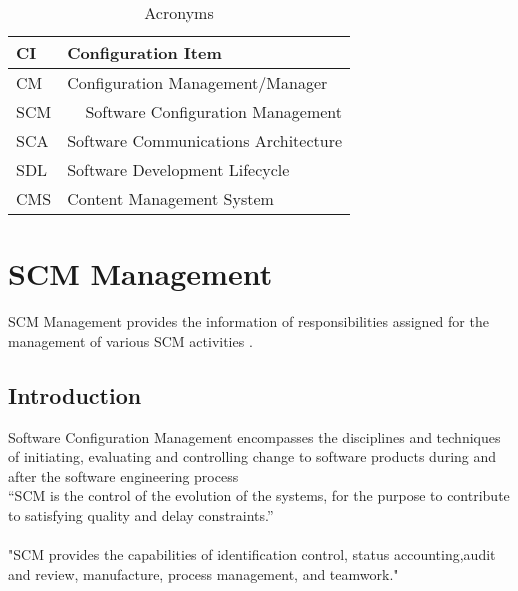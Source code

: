 \documentclass[]{article}
\begin{document}
\begin{table}[]
\centering
\caption{Acronyms}
\label{my-label}
\begin{tabular}{|l|l|}
\hline
CI  & Configuration Item                                     \\ \hline
CM  & Configuration Management/Manager                       \\ \hline
SCM & \multicolumn{1}{r|}{Software Configuration Management} \\ \hline
SCA & Software Communications Architecture                   \\ \hline
SDL & Software Development Lifecycle                         \\ \hline
CMS & Content Management System                              \\ \hline
\end{tabular}
\end{table}

\section{SCM Management}
SCM Management provides the information of responsibilities assigned for the management of various SCM activities .

\subsection{Introduction}
Software Configuration Management encompasses the disciplines and
techniques of initiating, evaluating and controlling change to software
products during and after the software engineering process\\

“SCM is the control of the evolution of the systems, for the purpose to contribute to 
satisfying quality and delay constraints.”
\\\\
"SCM provides the capabilities of identification control, status accounting,audit and review, manufacture, process management, and teamwork."
\end{document}
